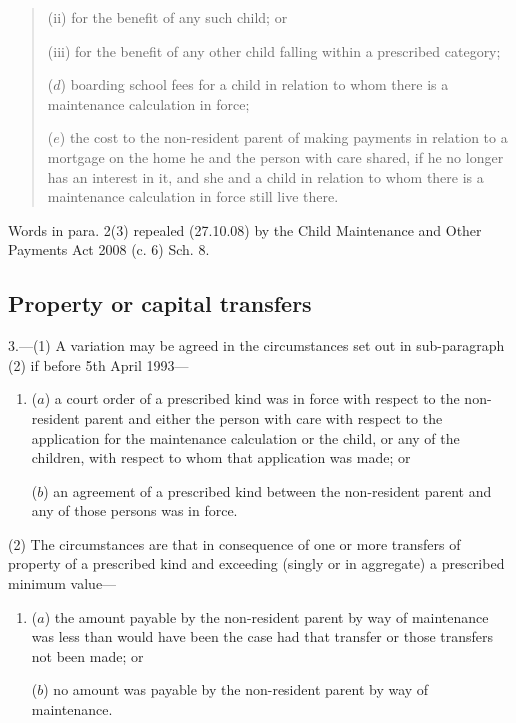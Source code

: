 \documentclass[a4paper]{article}
\begin{document}
{{\begin{quotation}
\begin{enumerate}
\begin{enumerate}
(ii)
for the benefit of any such child; or

(iii)
for the benefit of any other child falling within a
prescribed category;
\end{enumerate}

($d$) boarding school fees for a child in relation to whom there is a maintenance calculation in force;

($e$) the cost to the non-resident parent of making payments in relation to a mortgage on the home he and the person with care shared, if he no longer has an interest in it, and she and a child in relation to whom there is a maintenance calculation in force still live there.
\end{enumerate}
\end{quotation}

Words in para. 2(3) repealed (27.10.08) by the Child Maintenance and Other Payments Act 2008 (c. 6) Sch. 8.
}

\subsection*{Property or capital transfers}

3.—(1) A variation may be agreed in the circumstances set out in sub-paragraph
(2) if before 5th April 1993---
\begin{enumerate}\item[]
 ($a$) a court order of a prescribed kind was in force with respect to the non-resident parent and either the person with care with respect to the
application for the maintenance calculation or the child, or any of the children, with respect to whom that application was made; or

($b$) an agreement of a prescribed kind between the non-resident parent and any of those persons was in force.
\end{enumerate}

(2) The circumstances are that in consequence of one or more transfers of property of a prescribed kind and exceeding (singly or in aggregate) a prescribed minimum value---
\begin{enumerate}\item[]
($a$) the amount payable by the non-resident parent by way of maintenance was less than would have been the case had that transfer or those transfers not been made; or

($b$) no amount was payable by the non-resident parent by way of maintenance.
\end{enumerate}

}
\end{document}
